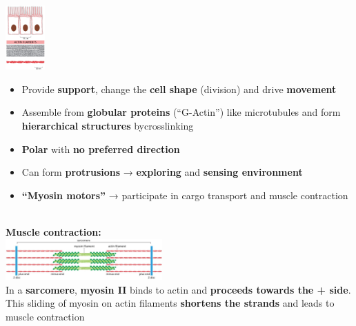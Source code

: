 \begin{minipage}{0.15\linewidth}
    \includegraphics[width=15mm]{src/Images/actin.png}
\end{minipage}
\begin{minipage}{0.85\linewidth}
\begin{itemize}
    \item Provide \textbf{support}, change the \textbf{cell shape} (division) and drive \textbf{movement}
    \item Assemble from \textbf{globular proteins} (“G-Actin”) like microtubules and form \textbf{hierarchical structures} bycrosslinking
    \item \textbf{Polar} with \textbf{no preferred direction}
    \item Can form \textbf{protrusions} → \textbf{exploring} and \textbf{sensing environment}
    \item \textbf{“Myosin motors”} → participate in cargo transport and muscle contraction
\end{itemize}
\end{minipage}\\

\textbf{Muscle contraction:}\\
\includegraphics[width=60mm]{src/Images/muscle_contraction.png}\\
In a \textbf{sarcomere}, \textbf{myosin II} binds to actin and \textbf{proceeds towards the + side}.\\
This sliding of myosin on actin filaments \textbf{shortens the strands} and leads to muscle contraction
